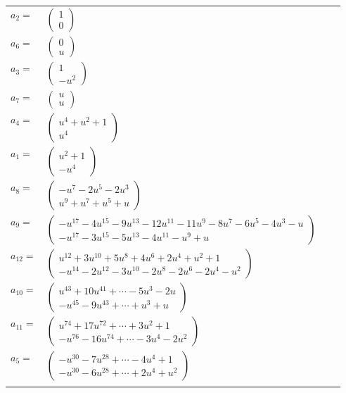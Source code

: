 \documentclass[1p]{elsarticle_modified}
\theoremstyle{definition}
\begin{document}
\begin{tabular}{m{7pt} m{180pt} m{7pt} m{180pt} }
\flushright $a_{2}=$&$\begin{pmatrix}1\\0\end{pmatrix}$ \\
\flushright $a_{6}=$&$\begin{pmatrix}0\\u\end{pmatrix}$ \\
\flushright $a_{3}=$&$\begin{pmatrix}1\\- u^2\end{pmatrix}$ \\
\flushright $a_{7}=$&$\begin{pmatrix}u\\u\end{pmatrix}$ \\
\flushright $a_{4}=$&$\begin{pmatrix}u^4+u^2+1\\u^4\end{pmatrix}$ \\
\flushright $a_{1}=$&$\begin{pmatrix}u^2+1\\- u^4\end{pmatrix}$ \\
\flushright $a_{8}=$&$\begin{pmatrix}- u^7-2 u^5-2 u^3\\u^9+u^7+u^5+u\end{pmatrix}$ \\
\flushright $a_{9}=$&$\begin{pmatrix}- u^{17}-4 u^{15}-9 u^{13}-12 u^{11}-11 u^9-8 u^7-6 u^5-4 u^3- u\\- u^{17}-3 u^{15}-5 u^{13}-4 u^{11}- u^9+u\end{pmatrix}$ \\
\flushright $a_{12}=$&$\begin{pmatrix}u^{12}+3 u^{10}+5 u^8+4 u^6+2 u^4+u^2+1\\- u^{14}-2 u^{12}-3 u^{10}-2 u^8-2 u^6-2 u^4- u^2\end{pmatrix}$ \\
\flushright $a_{10}=$&$\begin{pmatrix}u^{43}+10 u^{41}+\cdots-5 u^3-2 u\\- u^{45}-9 u^{43}+\cdots+u^3+u\end{pmatrix}$ \\
\flushright $a_{11}=$&$\begin{pmatrix}u^{74}+17 u^{72}+\cdots+3 u^2+1\\- u^{76}-16 u^{74}+\cdots-3 u^4-2 u^2\end{pmatrix}$ \\
\flushright $a_{5}=$&$\begin{pmatrix}- u^{30}-7 u^{28}+\cdots-4 u^4+1\\- u^{30}-6 u^{28}+\cdots+2 u^4+u^2\end{pmatrix}$\\&\end{tabular}
\end{document}
